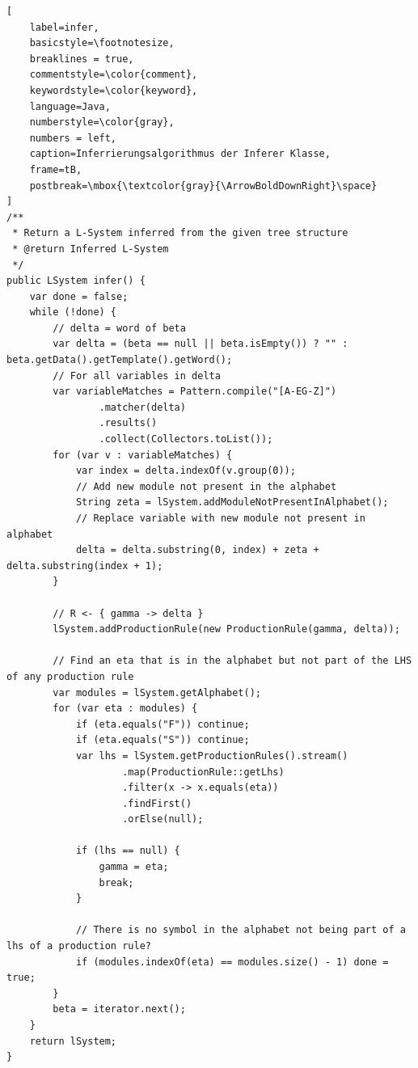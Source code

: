 \begin{lstlisting}[
    label=infer,
    basicstyle=\footnotesize,
    breaklines = true,
    commentstyle=\color{comment},
    keywordstyle=\color{keyword},
    language=Java,
    numberstyle=\color{gray},
    numbers = left,
    caption=Inferrierungsalgorithmus der Inferer Klasse,
    frame=tB,
    postbreak=\mbox{\textcolor{gray}{\ArrowBoldDownRight}\space}
]
/**
 * Return a L-System inferred from the given tree structure
 * @return Inferred L-System
 */
public LSystem infer() {
    var done = false;
    while (!done) {
        // delta = word of beta
        var delta = (beta == null || beta.isEmpty()) ? "" : beta.getData().getTemplate().getWord();
        // For all variables in delta
        var variableMatches = Pattern.compile("[A-EG-Z]")
                .matcher(delta)
                .results()
                .collect(Collectors.toList());
        for (var v : variableMatches) {
            var index = delta.indexOf(v.group(0));
            // Add new module not present in the alphabet
            String zeta = lSystem.addModuleNotPresentInAlphabet();
            // Replace variable with new module not present in alphabet
            delta = delta.substring(0, index) + zeta + delta.substring(index + 1);
        }

        // R <- { gamma -> delta }
        lSystem.addProductionRule(new ProductionRule(gamma, delta));

        // Find an eta that is in the alphabet but not part of the LHS of any production rule
        var modules = lSystem.getAlphabet();
        for (var eta : modules) {
            if (eta.equals("F")) continue;
            if (eta.equals("S")) continue;
            var lhs = lSystem.getProductionRules().stream()
                    .map(ProductionRule::getLhs)
                    .filter(x -> x.equals(eta))
                    .findFirst()
                    .orElse(null);

            if (lhs == null) {
                gamma = eta;
                break;
            }

            // There is no symbol in the alphabet not being part of a lhs of a production rule?
            if (modules.indexOf(eta) == modules.size() - 1) done = true;
        }
        beta = iterator.next();
    }
    return lSystem;
}
\end{lstlisting}

\newpage

